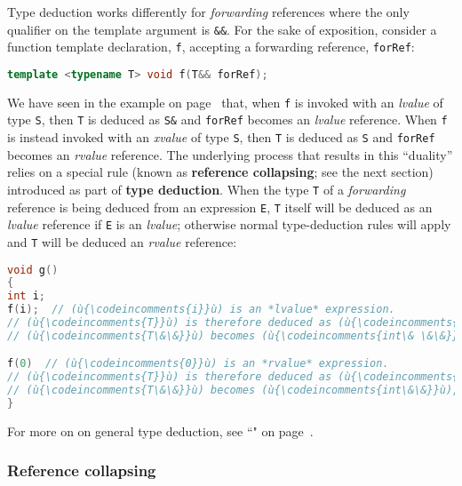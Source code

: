 \noindent Type deduction works differently for \emph{forwarding} references
where the only qualifier on the template argument is \texttt{\&\&}. For
the sake of exposition, consider a function template declaration,
\texttt{f}, accepting a forwarding reference, \texttt{forRef}:

\begin{lstlisting}[language=C++]
template <typename T> void f(T&& forRef);
\end{lstlisting}

\noindent We have seen in the example on page~\pageref{f-invoked-example} that,
when \texttt{f} is invoked with an
\emph{lvalue} of type \texttt{S}, then \texttt{T} is deduced as
\texttt{S\&} and \texttt{forRef} becomes an \emph{lvalue} reference.
When \texttt{f} is instead invoked with an \emph{xvalue} of type
\texttt{S}, then \texttt{T} is deduced as \texttt{S} and
\texttt{forRef} becomes an \emph{rvalue} reference. The underlying
process that results in this ``duality'' relies on a special rule (known
as \textbf{reference collapsing}; see the next section) introduced as part of
\textbf{type deduction}. When the type \texttt{T} of a
\emph{forwarding} reference is being deduced from an expression
\texttt{E}, \texttt{T} itself will be deduced as an \emph{lvalue}
reference if \texttt{E} is an \emph{lvalue}; otherwise normal
type-deduction rules will apply and \texttt{T} will be deduced an \emph{rvalue}
reference:

\begin{lstlisting}[language=C++]
void g()
{
int i;
f(i);  // (ù{\codeincomments{i}}ù) is an *lvalue* expression.
// (ù{\codeincomments{T}}ù) is therefore deduced as (ù{\codeincomments{int\&}}ù) -- special rule!
// (ù{\codeincomments{T\&\&}}ù) becomes (ù{\codeincomments{int\& \&\&}}ù), which collapses to (ù{\codeincomments{int\&}}ù).

f(0)  // (ù{\codeincomments{0}}ù) is an *rvalue* expression.
// (ù{\codeincomments{T}}ù) is therefore deduced as (ù{\codeincomments{int}}ù).
// (ù{\codeincomments{T\&\&}}ù) becomes (ù{\codeincomments{int\&\&}}ù), which is an *rvalue* reference.
}
\end{lstlisting}

\noindent For more on on general type deduction, see ``" on page~\pageref{auto-feature}.

\subsubsection[Reference collapsing]{Reference collapsing}\label{reference-collapsing}

